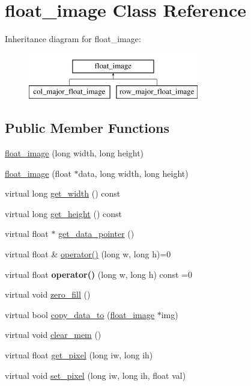 \hypertarget{classfloat__image}{\section{float\-\_\-image Class Reference}
\label{classfloat__image}
}
Inheritance diagram for float\-\_\-image\-:\begin{figure}[H]
\begin{center}
\leavevmode
\includegraphics[height=2.000000cm]{classfloat__image}
\end{center}
\end{figure}
\subsection*{Public Member Functions}
\begin{DoxyCompactItemize}
\item 
\hyperlink{classfloat__image_a9e4ea7f98eb8c33e025cd21d61703c66}{float\-\_\-image} (long width, long height)
\item 
\hyperlink{classfloat__image_a4626247e8da835a5be04e346b577f85e}{float\-\_\-image} (float $\ast$data, long width, long height)
\item 
virtual long \hyperlink{classfloat__image_a08ba5e995f656dfebc5aaad0a9be390c}{get\-\_\-width} () const 
\item 
virtual long \hyperlink{classfloat__image_aeab41642909a0ee8d6e0ffcc2e7287b1}{get\-\_\-height} () const 
\item 
virtual float $\ast$ \hyperlink{classfloat__image_ab6dbf1f20614ba84f7b8f2c01b7aa3da}{get\-\_\-data\-\_\-pointer} ()
\item 
virtual float \& \hyperlink{classfloat__image_a62e1446efb51fadcfeebf50568f9d1e9}{operator()} (long w, long h)=0
\item 
\hypertarget{classfloat__image_ae3ae19180d1903bdeb0ffdb6f509a9f5}{virtual float {\bfseries operator()} (long w, long h) const =0}\label{classfloat__image_ae3ae19180d1903bdeb0ffdb6f509a9f5}

\item 
virtual void \hyperlink{classfloat__image_adffd8782a04ea4d764865aace1e43c93}{zero\-\_\-fill} ()
\item 
virtual bool \hyperlink{classfloat__image_a9cead12d50823ca313f6b7b16a57b092}{copy\-\_\-data\-\_\-to} (\hyperlink{classfloat__image}{float\-\_\-image} $\ast$img)
\item 
virtual void \hyperlink{classfloat__image_a3ef2df1d69f6791d2bef54636b625f82}{clear\-\_\-mem} ()
\item 
virtual float \hyperlink{classfloat__image_a53701b38abc94f8a707e8ceb2e6e71da}{get\-\_\-pixel} (long iw, long ih)
\item 
virtual void \hyperlink{classfloat__image_a97b520fc634fc4eb1930491b74d1f79b}{set\-\_\-pixel} (long iw, long ih, float val)
\end{DoxyCompactItemize}
